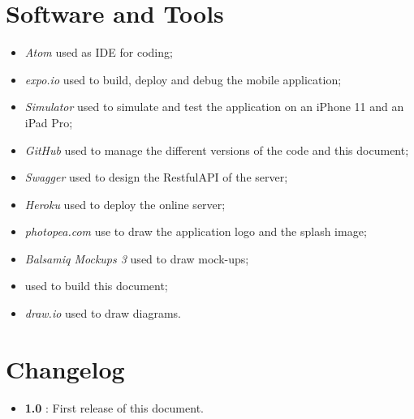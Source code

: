 \section{Software and Tools}
\begin{itemize}
  \item \textit{Atom} used as IDE for coding;
  \item \textit{expo.io} used to build, deploy and debug the mobile application;
  \item \textit{Simulator} used to simulate and test the application on an iPhone 11 and an iPad Pro;
  \item \textit{GitHub} used to manage the different versions of the code and this document;
  \item \textit{Swagger} used to design the RestfulAPI of the server;
  \item \textit{Heroku} used to deploy the online server;
  \item \textit{photopea.com} use to draw the application logo and the splash image;
  \item \textit{Balsamiq Mockups 3} used to draw mock-ups;
  \item \text{\LaTeX} used to build this document;
   \item \textit{draw.io} used to draw diagrams.
\end{itemize}


\section{Changelog} \label{Changelog}
\begin{itemize}
  \item \textbf{1.0} : First release of this document.
\end{itemize}